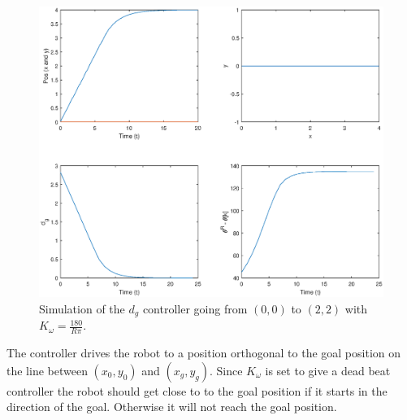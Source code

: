 \begin{figure}[H]
    \centering
    \includegraphics[width=\textwidth]{figs/perf-dg.eps}
    \caption{Simulation of the $d_g$  controller going from $(0, 0)$ to $(2, 2)$ with $K_\omega= \frac{180}{R \pi}.$}\label{fig:perf-dg}
\end{figure}

The controller drives the robot to a position orthogonal to the goal position on the line between $(x_0, y_0)$ and $(x_g, y_g)$. Since $K_\omega$ is set to give a dead beat controller the robot should get close to to the goal position if it starts in the direction of the goal. Otherwise it will not reach the goal position.